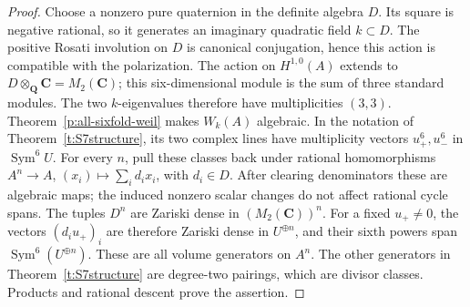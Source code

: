 \documentclass[11pt,reqno]{article}
\theoremstyle{emphasizedplain}
\theoremstyle{emphasizeddefinition}
\theoremstyle{emphasizeddefinition}
\DeclareMathOperator{\Sym}{Sym}
\newcommand{\Q}{\mathbf Q}
\newcommand{\C}{\mathbf C}
\begin{document}
\begin{proof}
Choose a nonzero pure quaternion in the definite algebra $D$.
Its square is negative rational, so it generates an imaginary
quadratic field $k\subset D$. The positive Rosati involution on
$D$ is canonical conjugation, hence this action is compatible with
the polarization. The action on $H^{1,0}(A)$ extends to
$D\otimes_\Q\C=M_2(\C)$; this six-dimensional module is the
sum of three standard modules. The two $k$-eigenvalues therefore
have multiplicities $(3,3)$.
Theorem~\ref{p:all-sixfold-weil} makes $W_k(A)$ algebraic.
In the notation of Theorem~\ref{t:S7structure}, its two complex
lines have multiplicity vectors $u_+^6,u_-^6$ in $\Sym^6 U$.
For every $n$, pull these classes back under rational homomorphisms
$A^n\to A$, $(x_i)\mapsto\sum_i d_i x_i$, with $d_i\in D$.
After clearing denominators these are algebraic maps; the induced
nonzero scalar changes do not affect rational cycle spans.
The tuples $D^n$ are Zariski dense in $(M_2(\C))^n$.
For a fixed $u_+\ne0$, the vectors $(d_i u_+)_i$ are therefore
Zariski dense in $U^{\oplus n}$, and their sixth powers span
$\Sym^6(U^{\oplus n})$. These are all volume generators on
$A^n$. The other generators in Theorem~\ref{t:S7structure} are
degree-two pairings, which are divisor classes. Products and
rational descent prove the assertion.
\end{proof}
\end{document}
